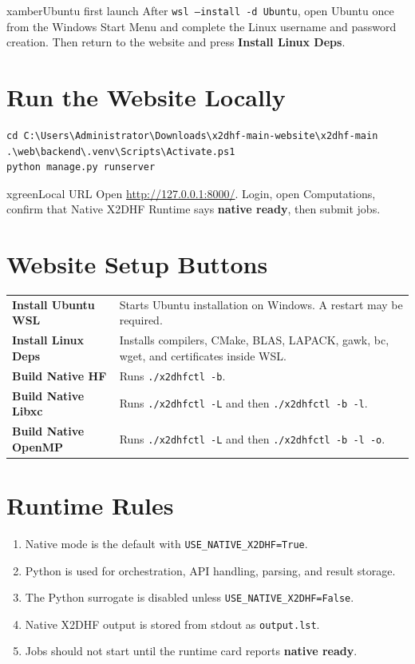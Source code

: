 \documentclass[11pt,a4paper]{article}
\begin{document}
\begin{xbox}{xamber}{Ubuntu first launch}
After \texttt{wsl --install -d Ubuntu}, open Ubuntu once from the Windows Start Menu and complete the Linux username and password creation. Then return to the website and press \textbf{Install Linux Deps}.
\end{xbox}

\section{Run the Website Locally}

\begin{lstlisting}[style=xcmd]
cd C:\Users\Administrator\Downloads\x2dhf-main-website\x2dhf-main
.\web\backend\.venv\Scripts\Activate.ps1
python manage.py runserver
\end{lstlisting}

\begin{xbox}{xgreen}{Local URL}
Open \href{http://127.0.0.1:8000/}{http://127.0.0.1:8000/}. Login, open Computations, confirm that Native X2DHF Runtime says \textbf{native ready}, then submit jobs.
\end{xbox}

\section{Website Setup Buttons}

\begin{tabularx}{\textwidth}{>{\bfseries}p{4cm}X}
Install Ubuntu WSL & Starts Ubuntu installation on Windows. A restart may be required. \\
Install Linux Deps & Installs compilers, CMake, BLAS, LAPACK, gawk, bc, wget, and certificates inside WSL. \\
Build Native HF & Runs \texttt{./x2dhfctl -b}. \\
Build Native Libxc & Runs \texttt{./x2dhfctl -L} and then \texttt{./x2dhfctl -b -l}. \\
Build Native OpenMP & Runs \texttt{./x2dhfctl -L} and then \texttt{./x2dhfctl -b -l -o}. \\
\end{tabularx}

\section{Runtime Rules}

\begin{enumerate}[leftmargin=*]
\item Native mode is the default with \texttt{USE\_NATIVE\_X2DHF=True}.
\item Python is used for orchestration, API handling, parsing, and result storage.
\item The Python surrogate is disabled unless \texttt{USE\_NATIVE\_X2DHF=False}.
\item Native X2DHF output is stored from stdout as \texttt{output.lst}.
\item Jobs should not start until the runtime card reports \textbf{native ready}.
\end{enumerate}
\end{document}
